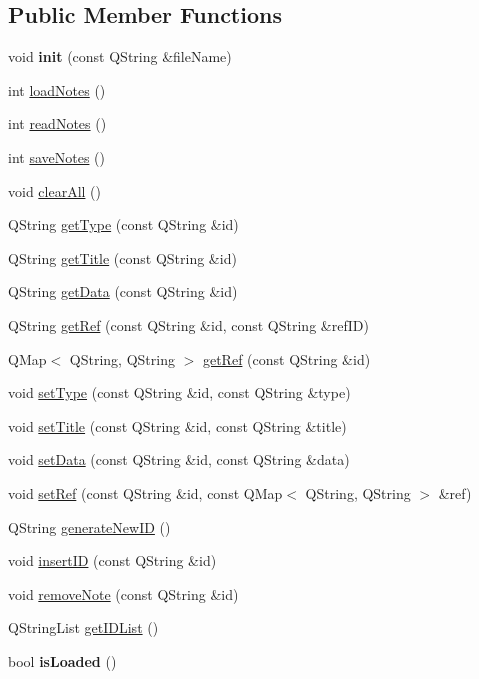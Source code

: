 \subsection*{Public Member Functions}
\begin{DoxyCompactItemize}
\item 
\hypertarget{classNotes_a6b5c3b7e6c556f106933aaade3952fe3}{
void {\bfseries init} (const QString \&fileName)}
\label{classNotes_a6b5c3b7e6c556f106933aaade3952fe3}

\item 
int \hyperlink{classNotes_a91273d4a534e6426adb63bef043b4dbc}{loadNotes} ()
\item 
int \hyperlink{classNotes_aa47d6a7af0c2674fe6d3372280755d5b}{readNotes} ()
\item 
int \hyperlink{classNotes_af76c3652cd25371b7233eb84079b39a0}{saveNotes} ()
\item 
void \hyperlink{classNotes_a9abdabc242dc6340e4b5157fb3620ee0}{clearAll} ()
\item 
QString \hyperlink{classNotes_a8fe0144e2c4f5566f1ba03545dba94e4}{getType} (const QString \&id)
\item 
QString \hyperlink{classNotes_a784bbf981f20f1ffc9a07c32d1f2ad2f}{getTitle} (const QString \&id)
\item 
QString \hyperlink{classNotes_a3a60de9ba1c1fc3e1cd118ca50443f02}{getData} (const QString \&id)
\item 
QString \hyperlink{classNotes_ae1fdbee2ecd121c81c7eb1c48404094d}{getRef} (const QString \&id, const QString \&refID)
\item 
QMap$<$ QString, QString $>$ \hyperlink{classNotes_a2452989d91340c9158210421a5d16362}{getRef} (const QString \&id)
\item 
void \hyperlink{classNotes_a2e471d6614087c21ad4265596387312c}{setType} (const QString \&id, const QString \&type)
\item 
void \hyperlink{classNotes_ace9ed14dfa9f9ca785070b70a06deec3}{setTitle} (const QString \&id, const QString \&title)
\item 
void \hyperlink{classNotes_a176683f801c998ff85f667947c41c7d9}{setData} (const QString \&id, const QString \&data)
\item 
void \hyperlink{classNotes_ad42175f40ec450badc4ed396229a3246}{setRef} (const QString \&id, const QMap$<$ QString, QString $>$ \&ref)
\item 
QString \hyperlink{classNotes_ab554798a22ce20a2f7cb195c3b1904bd}{generateNewID} ()
\item 
void \hyperlink{classNotes_a08ba874a751ba5fde4620ac5b5ff8037}{insertID} (const QString \&id)
\item 
void \hyperlink{classNotes_a86b09275d829523b0eb42da6b008a580}{removeNote} (const QString \&id)
\item 
QStringList \hyperlink{classNotes_aee2eb5a4a6cf347e38351585de15c013}{getIDList} ()
\item 
\hypertarget{classNotes_ab2acad06062836577b93e8ab64e5b1a8}{
bool {\bfseries isLoaded} ()}
\label{classNotes_ab2acad06062836577b93e8ab64e5b1a8}


\end{DoxyCompactItemize}
